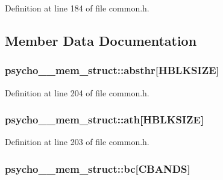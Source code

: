 Definition at line 184 of file common.\+h.



\subsection{Member Data Documentation}
\subsubsection[{\texorpdfstring{absthr}{absthr}}]{ psycho\+\_\+\_\+mem\+\_\+struct\+::absthr\mbox{[}{\bf H\+B\+L\+K\+S\+I\+ZE}\mbox{]}}\hypertarget{structpsycho__4__mem__struct_af0409299aa64bbb3217d1304dc8b3f08}{}\label{structpsycho__4__mem__struct_af0409299aa64bbb3217d1304dc8b3f08}


Definition at line 204 of file common.\+h.

\subsubsection[{\texorpdfstring{ath}{ath}}]{ psycho\+\_\+\_\+mem\+\_\+struct\+::ath\mbox{[}{\bf H\+B\+L\+K\+S\+I\+ZE}\mbox{]}}\hypertarget{structpsycho__4__mem__struct_a505d059dfef947375375adb9c667c57b}{}\label{structpsycho__4__mem__struct_a505d059dfef947375375adb9c667c57b}


Definition at line 203 of file common.\+h.

\subsubsection[{\texorpdfstring{bc}{bc}}]{ psycho\+\_\+\_\+mem\+\_\+struct\+::bc\mbox{[}{\bf C\+B\+A\+N\+DS}\mbox{]}}\hypertarget{structpsycho__4__mem__struct_aac0b26e8bfd1a76562d5c6ac31fc3f40}{}\label{structpsycho__4__mem__struct_aac0b26e8bfd1a76562d5c6ac31fc3f40}


